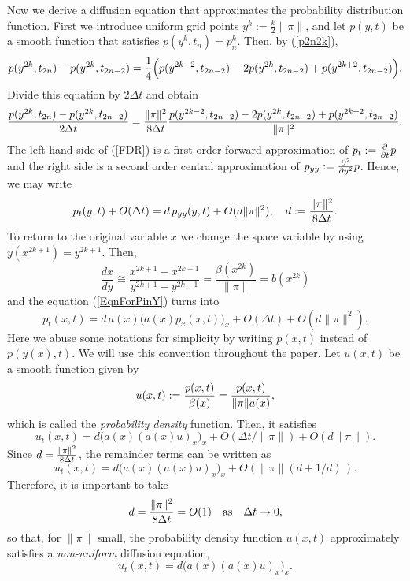 \documentclass[11pt]{amsart}
\def\d{d}
\begin{document}
Now we derive a diffusion equation that approximates the probability distribution function. First we introduce uniform grid points $y^k := \frac{k}{2}\|\pi\|$, and let $p(y,t)$ be a smooth function that satisfies $p(y^k,t_n)=p^k_n$. Then, by (\ref{p2n2k}),
$$
{p(y^{2k},t_{2n})-p(y^{2k},t_{2n-2})} ={1\over 4} \Big(p(y^{2k-2},t_{2n-2})-2p(y^{2k},t_{2n-2})+p(y^{2k+2},t_{2n-2})\Big).
$$
Divide this equation by $2\Delta t$ and obtain
\begin{equation}\label{FDR}
\begin{split}
{p(y^{2k},t_{2n})-p(y^{2k},t_{2n-2})\over 2\Delta t}
={\|\pi\|^2\over 8\Delta t} {p(y^{2k-2},t_{2n-2})-2p(y^{2k},t_{2n-2})+p(y^{2k+2},t_{2n-2}) \over \|\pi\|^2}.
\end{split}
\end{equation}
The left-hand side of (\ref{FDR}) is a first order forward approximation of $p_t:={\partial\over\partial t}p$ and the right side is a second order central approximation of $p_{yy}:={\partial^2\over\partial y^2}p$. Hence, we may write
\begin{equation}\label{EqnForPinY}
p_t(y,t)+O(\Delta t)=\d\,p_{yy}(y,t)+O(\d\|\pi\|^2),\quad \d:={\|\pi\|^2\over 8\Delta t}.
\end{equation}
To return to the original variable $x$ we change the space variable by using $y(x^{2k+1})=y^{2k+1}$. Then,
\begin{equation}\label{a(x)}
\frac{dx}{dy} \cong \frac{x^{2k+1}-x^{2k-1}}{y^{2k+1}-y^{2k-1}} =\frac{\beta(x^{2k})}{\|\pi\|}=b(x^{2k})
\end{equation}
and the equation (\ref{EqnForPinY}) turns into
\begin{equation*}\label{EqnForPinX}
p_t(x,t)=\d\,a(x) \big( a(x)p_x(x,t) \big)_x+O(\Delta t)+O(\d\|\pi\|^2).
\end{equation*}
Here we abuse some notations for simplicity by writing $p(x,t)$ instead of $p(y(x),t)$. We will use this convention throughout the paper. Let $u(x,t)$ be a smooth function given by
\begin{equation}\label{ProbabilityDensity}
u(x,t):={p(x,t)\over\beta(x)} ={p(x,t)\over \|\pi\|a(x)},
\end{equation}
which is called the \emph{probability density} function. Then, it satisfies
\[
u_t(x,t)=\d \big(a(x)(a(x)u)_x)_x+O(\Delta t/\|\pi\|)+O(\d\|\pi\|).
\]
Since $\d={\|\pi\|^2\over 8\Delta t}$, the remainder terms can be written as
\[
u_t(x,t)=\d\big(a(x)(a(x)u)_x)_x+O(\|\pi\|(\d+{1/\d})\,).
\]
Therefore, it is important to take
\begin{equation}\label{diffusivity}
\d={\|\pi\|^2\over 8\Delta t}=O(1)\quad\mbox{as}\quad\Delta t\to0,
\end{equation}
so that, for $\|\pi\|$ small, the probability density function $u(x,t)$ approximately satisfies a \emph{non-uniform} diffusion equation,
\begin{equation}\label{DiffusionEqn1}
u_t(x,t)=\d\big(a(x)(a(x)u)_x)_x.
\end{equation}
\end{document}
